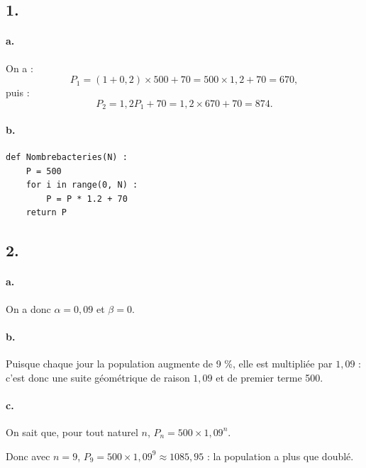 \subsection*{1.}

\paragraph{a.} On a :
\[
P_1 = (1 + 0{,}2) \times 500 + 70 = 500 \times 1{,}2 + 70 = 670,
\]
puis :
\[
P_2 = 1{,}2P_1 + 70 = 1{,}2 \times 670 + 70 = 874.
\]

\paragraph{b.}
\begin{center}
\begin{lstlisting}[style=python]
def Nombrebacteries(N) :
    P = 500
    for i in range(0, N) :
        P = P * 1.2 + 70
    return P
\end{lstlisting}
\end{center}

\subsection*{2.}

\paragraph{a.} On a donc \(\alpha = 0{,}09\) et \(\beta = 0\).

\paragraph{b.} Puisque chaque jour la population augmente de 9 \%, elle est multipliée par \(1{,}09\) : c'est donc une suite géométrique de raison \(1{,}09\) et de premier terme 500.

\paragraph{c.} On sait que, pour tout naturel \(n\), \(P_n = 500 \times 1{,}09^n\).

Donc avec \(n = 9\), \(P_9 = 500 \times 1{,}09^9 \approx 1085{,}95\) : la population a plus que doublé.
